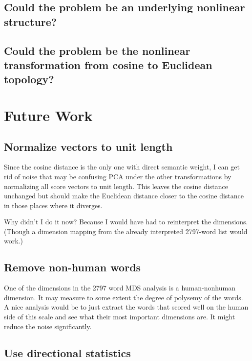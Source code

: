 \documentclass[eric_thesis.tex]{subfiles}
\begin{document}
\section{Could the problem be an underlying nonlinear structure?}

\section{Could the problem be the nonlinear transformation from cosine to Euclidean topology?}

\chapter{Future Work}

\section{Normalize vectors to unit length}


Since the cosine distance is the only one with direct semantic weight, I can 
get rid of noise that may be confusing PCA under the other transformations by
normalizing all score vectors to unit length. This leaves the cosine distance
unchanged but should make the Euclidean distance closer to the cosine distance
in those places where it diverges.

Why didn't I do it now? Because I would have had to reinterpret the dimensions.
(Though a dimension mapping from the already interpreted 2797-word list would
work.)

\section{Remove non-human words}


One of the dimensions in the 2797 word MDS analysis is a human-nonhuman 
dimension. It may measure to some extent the degree of polysemy of the words. A 
nice analysis would be to just extract the words that scored well on the human 
side of this scale and see what their most important dimensions are. It might 
reduce the noise significantly.

\section{Use directional statistics}

\end{document}
